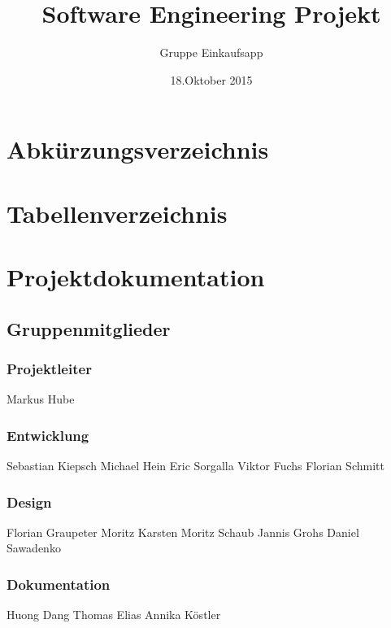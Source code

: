\documentclass[12pt,a4paper]{article}
\begin{document}
\title{Software Engineering Projekt}
\author{Gruppe Einkaufsapp}
\date {18.Oktober 2015}
\maketitle
\newpage
\tableofcontents
\newpage
\newpage
\section*{Abkürzungsverzeichnis}
\newpage
\section*{Tabellenverzeichnis}
\newpage
\section*{Projektdokumentation}
\subsection*{Gruppenmitglieder}
\subsubsection*{Projektleiter}
Markus Hube
\subsubsection*{Entwicklung}
Sebastian Kiepsch
\newline
Michael Hein
\newline
Eric Sorgalla
\newline
Viktor Fuchs
\newline
Florian Schmitt 
\subsubsection*{Design}
Florian Graupeter
\newline
Moritz Karsten
\newline
Moritz Schaub
\newline
Jannis Grohs
\newline
Daniel Sawadenko 
\subsubsection*{Dokumentation}
Huong Dang
\newline
Thomas Elias
\newline
Annika Köstler
\newpage

\end{document}
